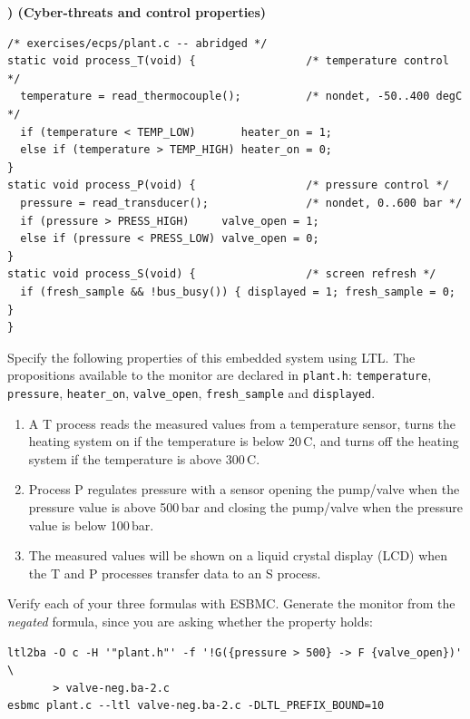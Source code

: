 \documentclass[11pt,a4paper]{article}
\newcommand{\esbmc}{ESBMC}
\newcommand{\file}[1]{\texttt{\small #1}}
\newcounter{exc}
\newenvironment{exercise}[1]
  {\stepcounter{exc}\medskip\noindent\textbf{\theexc) (#1)}\par\nopagebreak\smallskip}
  {\par\medskip}
\begin{document}
\begin{exercise}{Cyber-threats and control properties}
\begin{lstlisting}
/* exercises/ecps/plant.c -- abridged */
static void process_T(void) {                 /* temperature control */
  temperature = read_thermocouple();          /* nondet, -50..400 degC */
  if (temperature < TEMP_LOW)       heater_on = 1;
  else if (temperature > TEMP_HIGH) heater_on = 0;
}
static void process_P(void) {                 /* pressure control */
  pressure = read_transducer();               /* nondet, 0..600 bar */
  if (pressure > PRESS_HIGH)     valve_open = 1;
  else if (pressure < PRESS_LOW) valve_open = 0;
}
static void process_S(void) {                 /* screen refresh */
  if (fresh_sample && !bus_busy()) { displayed = 1; fresh_sample = 0; }
}
\end{lstlisting}

\begin{parts}
  \item Specify the following properties of this embedded system using LTL. The
        propositions available to the monitor are declared in \file{plant.h}:
        \texttt{temperature}, \texttt{pressure}, \texttt{heater\_on},
        \texttt{valve\_open}, \texttt{fresh\_sample} and \texttt{displayed}.
        \begin{enumerate}[label=\alph*.,leftmargin=2.2em,topsep=2pt]
          \item A T process reads the measured values from a temperature sensor,
                turns the heating system on if the temperature is below
                20\,\textdegree C, and turns off the heating system if the
                temperature is above 300\,\textdegree C.
          \item Process P regulates pressure with a sensor opening the pump/valve
                when the pressure value is above 500\,bar and closing the
                pump/valve when the pressure value is below 100\,bar.
          \item The measured values will be shown on a liquid crystal display
                (LCD) when the T and P processes transfer data to an S process.
        \end{enumerate}
  \item Verify each of your three formulas with \esbmc{}. Generate the monitor
        from the \emph{negated} formula, since you are asking whether the
        property holds:

\begin{lstlisting}[style=sh]
ltl2ba -O c -H '"plant.h"' -f '!G({pressure > 500} -> F {valve_open})' \
       > valve-neg.ba-2.c
esbmc plant.c --ltl valve-neg.ba-2.c -DLTL_PREFIX_BOUND=10
\end{lstlisting}


\end{parts}
\end{exercise}
\end{document}
